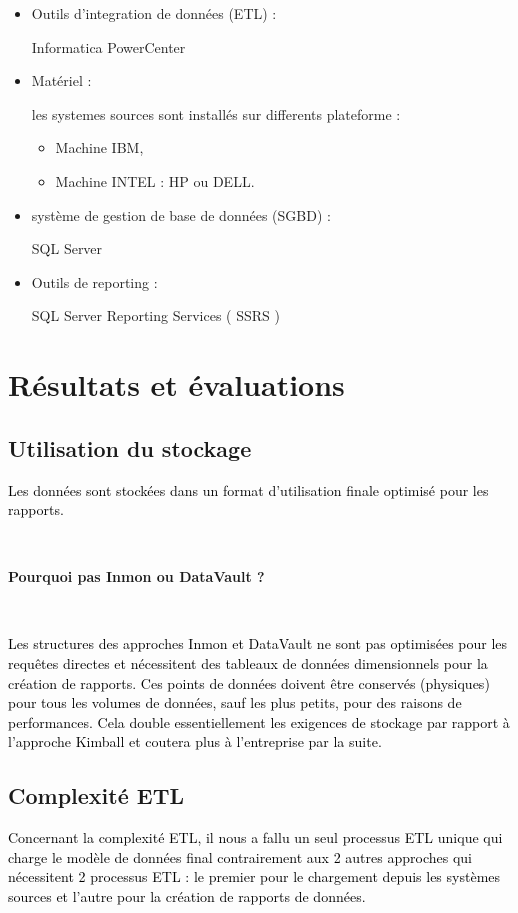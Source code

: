 \documentclass[a4paper,12pt]{report}
\begin{document}
\begin{itemize}

	\item \begin{bf} Outils d’integration de données (ETL) :\end{bf} Informatica PowerCenter
	\item \begin{bf} Matériel :\end{bf} les systemes sources sont installés sur differents plateforme :
	\begin{itemize}
        	\item Machine IBM,
        	\item Machine INTEL : HP ou DELL.
        \end{itemize}
	\item \begin{bf} système de gestion de base de données (SGBD) : \end{bf} SQL Server 
	\item \begin{bf} Outils de reporting : \end{bf} SQL Server Reporting Services ( SSRS )
    	
\end{itemize}


\section{Résultats et évaluations }
\subsection{Utilisation du stockage }
\textcolor{black}{Les données sont stockées dans un format d’utilisation finale optimisé pour les rapports.}

~\

\textbf{Pourquoi pas Inmon ou DataVault ? }

~\

\textcolor{black}{Les structures des approches Inmon et DataVault ne sont pas optimisées pour les requêtes directes et nécessitent des tableaux de données dimensionnels pour la création de rapports. Ces points de données doivent être conservés (physiques) pour tous les volumes de données, sauf les plus petits, pour des raisons de performances. Cela double essentiellement les exigences de stockage par rapport à l'approche Kimball et coutera plus à l’entreprise par la suite.}

\subsection{Complexité ETL }
\textcolor{black}{Concernant la complexité ETL, il nous a fallu un seul processus ETL unique qui charge le modèle de données final contrairement aux 2 autres approches qui nécessitent 2 processus ETL : le premier pour le chargement depuis les systèmes sources et l’autre pour la création de rapports de données.}
\end{document}
